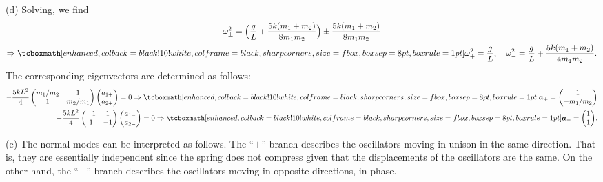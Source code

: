 {(d) Solving, we find
\begin{gather}
    \omega_{\pm}^2 = \Big( \frac{g}{L} + \frac{5 k (m_1 + m_2)}{8 m_1 m_2} \Big) \pm \frac{5 k (m_1 + m_2)}{8 m_1 m_2} \nonumber \\
    \Rightarrow \eqbox{ \omega_+^2 = \frac{g}{L}, \quad \omega_-^2 = \frac{g}{L} + \frac{5 k (m_1 + m_2)}{4 m_1 m_2} }
.\end{gather}
The corresponding eigenvectors are determined as follows:
\begin{align}
    -\frac{5 k L^2}{4} \begin{pmatrix}
        m_1 / m_2 & 1 \\
        1 & m_2 / m_1
    \end{pmatrix}
    \begin{pmatrix}
        a_{1+} \\ a_{2+}
    \end{pmatrix}
    = 0
    \Rightarrow \eqbox{ \vec{a}_+ = \begin{pmatrix}
        1 \\ -m_1/m_2
    \end{pmatrix}
}
\\
     -\frac{5 k L^2}{4} \begin{pmatrix}
        -1 & 1 \\
        1 & -1 
    \end{pmatrix}
    \begin{pmatrix}
        a_{1-} \\ a_{2-}
    \end{pmatrix}
    = 0
    \Rightarrow \eqbox{ \vec{a}_- = \begin{pmatrix}
        1 \\ 1
    \end{pmatrix}
}
.\end{align}

(e) The normal modes can be interpreted as follows.
The ``$+$'' branch describes the oscillators moving in unison in the same direction.
That is, they are essentially independent since the spring does not compress given that the displacements of the oscillators are the same.
On the other hand, the ``$-$'' branch describes the oscillators moving in opposite directions, in phase.

}



